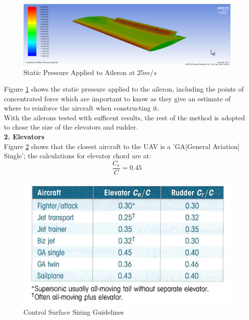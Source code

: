 \documentclass[12pt]{article}
\begin{document}
\begin{figure}[H]
\includegraphics[width=18cm, scale=1]{aileroncfd.png}
\caption{Static Pressure Applied to Aileron at $25m/s$}
\label{fig:aileroncfd}
\end{figure}

\noindent Figure \ref{fig:aileroncfd} shows the static pressure applied to the aileron, including the points of concentrated force which are important to know as they give an estimate of where to reinforce the aircraft when constructing it. \\

\noindent With the ailerons tested with sufficent results, the rest of the method is adopted to chose the size of the elevators and rudder. \\

\noindent \textbf{2. Elevators} \\
\noindent Figure \ref{fig:elevatorandrudder} shows that the closest aircraft to the UAV is a 'GA[General Aviation] Single'; the calculations for elevator chord are at: \\

\begin{equation} \label{eq}
\frac{C_e}{C}=0.45
\end{equation}

\begin{figure}[h!]
    \includegraphics[width=12cm, scale=1]{elevatorandrudder.png}
    \caption{Control Surface Sizing Guidelines \cite{AILERONREF}}
    \label{fig:elevatorandrudder}
\end{figure}
\end{document}

